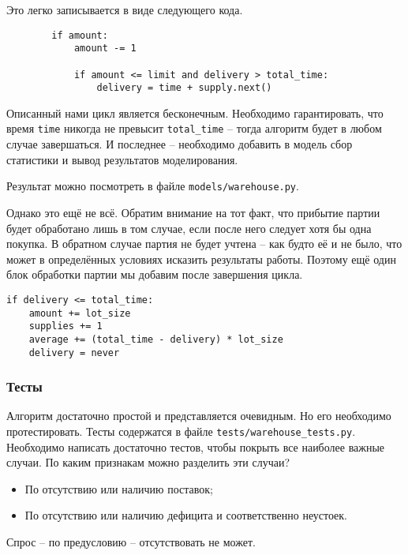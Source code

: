 \documentclass[12pt,final]{article}
\begin{document}
Это легко записывается в виде следующего кода.

\begin{verbatim}
        if amount:
            amount -= 1
            
            if amount <= limit and delivery > total_time:
                delivery = time + supply.next()
\end{verbatim}

Описанный нами цикл является бесконечным. Необходимо гарантировать, что время \texttt{time} никогда не превысит \texttt{total\_time} -- тогда алгоритм будет в любом случае завершаться. И последнее -- необходимо добавить в модель сбор статистики и вывод результатов моделирования.

Результат можно посмотреть в файле \texttt{models/warehouse.py}.

Однако это ещё не всё. Обратим внимание на тот факт, что прибытие партии будет обработано лишь в том случае, если после него следует хотя бы одна покупка. В обратном случае партия не будет учтена -- как будто её и не было, что может в определённых условиях исказить результаты работы. Поэтому ещё один блок обработки партии мы добавим после завершения цикла.

\begin{verbatim}
if delivery <= total_time:
    amount += lot_size
    supplies += 1
    average += (total_time - delivery) * lot_size
    delivery = never
\end{verbatim}

\subsubsection{Тесты}

Алгоритм достаточно простой и представляется очевидным. Но его необходимо протестировать. Тесты содержатся в файле \texttt{tests/warehouse\_tests.py}. Необходимо написать достаточно тестов, чтобы покрыть все наиболее важные случаи. По каким признакам можно разделить эти случаи?

\begin{itemize}
    \item По отсутствию или наличию поставок;
    \item По отсутствию или наличию дефицита и соответственно неустоек.
\end{itemize}

Спрос -- по предусловию -- отсутствовать не может.
\end{document}
